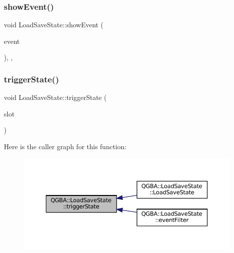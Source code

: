 \subsubsection{\texorpdfstring{show\+Event()}{showEvent()}}
{\footnotesize\ttfamily void Load\+Save\+State\+::show\+Event (\begin{DoxyParamCaption}\item[{Q\+Show\+Event $\ast$}]{event }\end{DoxyParamCaption})\hspace{0.3cm}{\ttfamily [override]}, {\ttfamily [protected]}, {\ttfamily [virtual]}}

\mbox{\label{class_q_g_b_a_1_1_load_save_state_a489a483482e19018b7f91a345c719d1f}} 
\subsubsection{\texorpdfstring{trigger\+State()}{triggerState()}}
{\footnotesize\ttfamily void Load\+Save\+State\+::trigger\+State (\begin{DoxyParamCaption}\item[{\mbox{\hyperlink{ioapi_8h_a787fa3cf048117ba7123753c1e74fcd6}{int}}}]{slot }\end{DoxyParamCaption})\hspace{0.3cm}{\ttfamily [private]}}

Here is the caller graph for this function\+:
\nopagebreak
\begin{figure}[H]
\begin{center}
\leavevmode
\includegraphics[width=350pt]{class_q_g_b_a_1_1_load_save_state_a489a483482e19018b7f91a345c719d1f_icgraph}
\end{center}
\end{figure}



